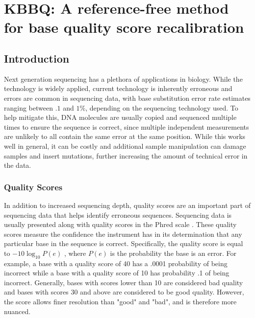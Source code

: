 \chapter{KBBQ: A reference-free method for base quality score recalibration}
\label{ch:kbbq}
\section{Introduction}

Next generation sequencing has a plethora of applications in biology. %
While the technology is widely applied, current technology is inherently erroneous and errors are common in sequencing data, with base substitution error rate estimates ranging between $.1$ and $1\%$, depending on the sequencing technology used. %
To help mitigate this, DNA molecules are usually copied and sequenced multiple times to ensure the sequence is correct, since multiple independent measurements are unlikely to all contain the same error at the same position. While this works well in general, it can be costly and additional sample manipulation can damage samples and insert mutations, further increasing the amount of technical error in the data. %

\subsection{Quality Scores}

In addition to increased sequencing depth, quality scores are an important part of sequencing data that helps identify erroneous sequences. Sequencing data is usually presented along with quality scores in the Phred scale \parencite{ewing_base-calling_1998, ewing_base-calling_1998-1}.
These quality scores measure the confidence the instrument has in its determination that any particular base in the sequence is correct.
Specifically, the quality score is equal to $-10\log_{10}P(e)$ \parencite{ewing_base-calling_1998} \parencite{ewing_base-calling_1998-1}, where $P(e)$ is the probability the base is an error.
For example, a base with a quality score of 40 has a .0001 probability of being incorrect while a base with a quality score of 10 has probability .1 of being incorrect. Generally, bases with scores lower than 10 are considered bad quality and bases with scores 30 and above are considered to be good quality. However, the score allows finer resolution than "good" and "bad", and is therefore more nuanced.

